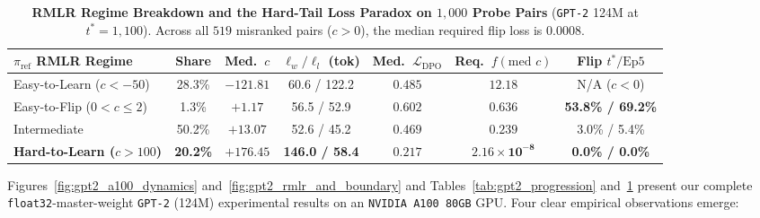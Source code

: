 \documentclass[11pt]{article}
\theoremstyle{plain}
\theoremstyle{definition}
\newcommand{\piref}{\pi_{\mathrm{ref}}}
\newcommand{\LDPO}{\mathcal{L}_{\mathrm{DPO}}}
\begin{document}
\begin{table}[t]
  \centering
  \caption{\textbf{RMLR Regime Breakdown and the Hard-Tail Loss Paradox on $1{,}000$ Probe Pairs} (\texttt{GPT-2} 124M at $t^* = 1{,}100$). Across all $519$ misranked pairs ($c > 0$), the median required flip loss is $0.0008$.}
  \label{tab:gpt2_probe_slices}
  \footnotesize
  \setlength{\tabcolsep}{2.0pt}
  \begin{tabular*}{\textwidth}{@{\extracolsep{\fill}}lcccccc@{}}
    \toprule
    \textbf{$\piref$ RMLR Regime} & \textbf{Share} & \textbf{Med.\ $c$} & \textbf{$\ell_w / \ell_l$ (tok)} & \textbf{Med.\ $\LDPO$} & \textbf{Req.\ $f(\text{med }c)$} & \textbf{Flip $t^* / \text{Ep5}$} \\
    \midrule
    Easy-to-Learn ($c < -50$) & 28.3\% & $-121.81$ & 60.6 / 122.2 & $0.485$ & $12.18$ & N/A ($c < 0$) \\
    Easy-to-Flip ($0 < c \le 2$) & 1.3\% & $+1.17$ & 56.5 / 52.9 & $0.602$ & $0.636$ & \textbf{53.8\% / 69.2\%} \\
    Intermediate & 50.2\% & $+13.07$ & 52.6 / 45.2 & $0.469$ & $0.239$ & 3.0\% / 5.4\% \\
    \textbf{Hard-to-Learn ($c > 100$)} & \textbf{20.2\%} & $\boldsymbol{+176.45}$ & \textbf{146.0 / 58.4} & $\boldsymbol{0.217}$ & $\boldsymbol{2.16 \times 10^{-8}}$ & \textbf{0.0\% / 0.0\%} \\
    \bottomrule
  \end{tabular*}
\end{table}

Figures~\ref{fig:gpt2_a100_dynamics} and~\ref{fig:gpt2_rmlr_and_boundary} and Tables~\ref{tab:gpt2_progression} and~\ref{tab:gpt2_probe_slices} present our complete \texttt{float32}-master-weight \texttt{GPT-2} (124M) experimental results on an \texttt{NVIDIA A100 80GB} GPU. Four clear empirical observations emerge:
\end{document}
